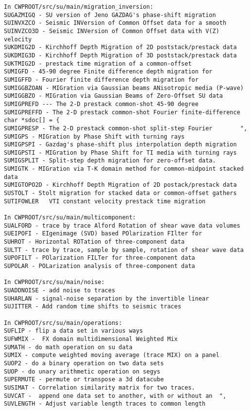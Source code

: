 {\begin{verbatim}
In CWPROOT/src/su/main/migration_inversion:
SUGAZMIGQ - SU version of Jeno GAZDAG's phase-shift migration 	
SUINVXZCO - Seismic INVersion of Common Offset data for a smooth 	
SUINVZCO3D - Seismic INVersion of Common Offset data with V(Z) velocity
SUKDMIG2D - Kirchhoff Depth Migration of 2D poststack/prestack data	
SUKDMIG3D - Kirchhoff Depth Migration of 3D poststack/prestack data	
SUKTMIG2D - prestack time migration of a common-offset	
SUMIGFD - 45-90 degree Finite difference depth migration for		
SUMIGFFD - Fourier finite difference depth migration for		
SUMIGGBZOAN - MIGration via Gaussian beams ANisotropic media (P-wave)	
SUMIGGBZO - MIGration via Gaussian Beams of Zero-Offset SU data	
SUMIGPREFD --- The 2-D prestack common-shot 45-90 degree		
SUMIGPREFFD - The 2-D prestack common-shot Fourier finite-difference	
char *sdoc[] = {
SUMIGPRESP - The 2-D prestack common-shot split-step Fourier		", 
SUMIGPS - MIGration by Phase Shift with turning rays			
SUMIGPSPI - Gazdag's phase-shift plus interpolation depth migration   
SUMIGPSTI - MIGration by Phase Shift for TI media with turning rays	
SUMIGSPLIT - Split-step depth migration for zero-offset data.         
SUMIGTK - MIGration via T-K domain method for common-midpoint stacked data
SUMIGTOPO2D - Kirchhoff Depth Migration of 2D postack/prestack data	
SUSTOLT - Stolt migration for stacked data or common-offset gathers	
SUTIFOWLER   VTI constant velocity prestack time migration		

In CWPROOT/src/su/main/multicomponent:
SUALFORD - trace by trace Alford Rotation of shear wave data volumes  
SUEIPOFI - EIgenimage (SVD) based POlarization FIlter for             
SUHROT - Horizontal ROTation of three-component data			
SULTT - trace by trace, sample by sample, rotation of shear wave data 
SUPOFILT - POlarization FILTer for three-component data               
SUPOLAR - POLarization analysis of three-component data               

In CWPROOT/src/su/main/noise:
SUADDNOISE - add noise to traces					
SUHARLAN - signal-noise separation by the invertible linear		
SUJITTER - Add random time shifts to seismic traces			

In CWPROOT/src/su/main/operations:
SUFLIP - flip a data set in various ways			
SUFWMIX -  FX domain multidimensional Weighted Mix			
SUMATH - do math operation on su data 		
SUMIX - compute weighted moving average (trace MIX) on a panel	
SUOP2 - do a binary operation on two data sets			
SUOP - do unary arithmetic operation on segys 		
SUPERMUTE - permute or transpose a 3d datacube	 		
SUSIMAT - Correlation similarity matrix for two traces.		
SUVCAT -  append one data set to another, with or without an  ", 
SUVLENGTH - Adjust variable length traces to common length   	


\end{verbatim}}
